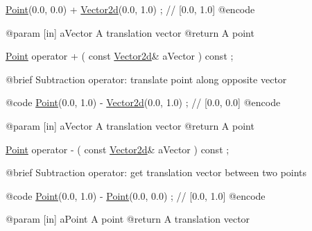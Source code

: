 \begin{DoxyCode}
                        \hyperlink{classostk_1_1math_1_1geom_1_1d2_1_1objects_1_1_point_ad4252af4171fbe3cff37ada7827e1966}{Point}(0.0, 0.0) + \hyperlink{namespaceostk_1_1math_1_1obj_a5ce374bc225ecfb685da4fed9aa67e6e}{Vector2d}(0.0, 1.0) ; \textcolor{comment}{// [0.0, 1.0]}
    @encode
   
    @param              [in] aVector A translation vector
    @\textcolor{keywordflow}{return}             A point

\hyperlink{classostk_1_1math_1_1geom_1_1d2_1_1objects_1_1_point_ad4252af4171fbe3cff37ada7827e1966}{Point}                   operator +                                  (   \textcolor{keyword}{const}   
      \hyperlink{namespaceostk_1_1math_1_1obj_a5ce374bc225ecfb685da4fed9aa67e6e}{Vector2d}&                   aVector                                     ) \textcolor{keyword}{const} ;

    @brief              Subtraction \textcolor{keyword}{operator}: translate point along opposite vector
   
    @code
                        \hyperlink{classostk_1_1math_1_1geom_1_1d2_1_1objects_1_1_point_ad4252af4171fbe3cff37ada7827e1966}{Point}(0.0, 1.0) - \hyperlink{namespaceostk_1_1math_1_1obj_a5ce374bc225ecfb685da4fed9aa67e6e}{Vector2d}(0.0, 1.0) ; \textcolor{comment}{// [0.0, 0.0]}
    @encode
   
    @param              [in] aVector A translation vector
    @\textcolor{keywordflow}{return}             A point

\hyperlink{classostk_1_1math_1_1geom_1_1d2_1_1objects_1_1_point_ad4252af4171fbe3cff37ada7827e1966}{Point}                   operator -                                  (   \textcolor{keyword}{const}   
      \hyperlink{namespaceostk_1_1math_1_1obj_a5ce374bc225ecfb685da4fed9aa67e6e}{Vector2d}&                   aVector                                     ) \textcolor{keyword}{const} ;

    @brief              Subtraction \textcolor{keyword}{operator}: \textcolor{keyword}{get} translation vector between two points
   
    @code
                        \hyperlink{classostk_1_1math_1_1geom_1_1d2_1_1objects_1_1_point_ad4252af4171fbe3cff37ada7827e1966}{Point}(0.0, 1.0) - \hyperlink{classostk_1_1math_1_1geom_1_1d2_1_1objects_1_1_point_ad4252af4171fbe3cff37ada7827e1966}{Point}(0.0, 0.0)  ; \textcolor{comment}{// [0.0, 1.0]}
    @encode
   
    @param              [in] aPoint A point
    @\textcolor{keywordflow}{return}             A translation vector


\end{DoxyCode}
